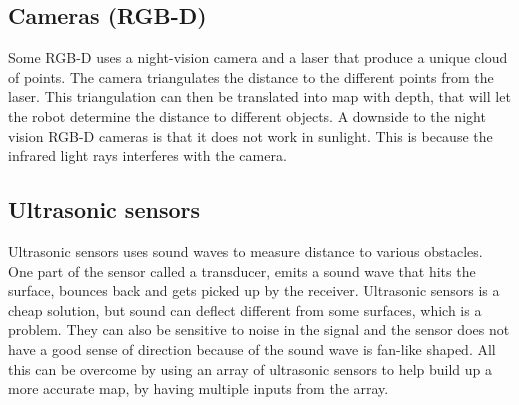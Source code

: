 \subsection{Cameras (RGB-D)} \label{ch:CameraRGB}

Some RGB-D uses a night-vision camera and a laser that produce a unique cloud of points. The camera triangulates the distance to the different points from the laser. This triangulation can then be translated into map with depth, that will let the robot determine the distance to different objects. 
A downside to the night vision RGB-D cameras is that it does not work in sunlight. This is because the infrared light rays interferes with the camera\cite{Cameras}.

\subsection{Ultrasonic sensors}
Ultrasonic sensors uses sound waves to measure distance to various obstacles. One part of the sensor called a transducer, emits a sound wave that hits the surface, bounces back and gets picked up by the receiver. 
Ultrasonic sensors is a cheap solution, but sound can deflect different from some surfaces, which is a problem. They can also be sensitive to noise in the signal and the sensor does not have a good sense of direction because of the sound wave is fan-like shaped. All this can be overcome by using an array of ultrasonic sensors to help build up a more accurate map, by having multiple inputs from the array\cite{Ultrasonicsnesor}.
